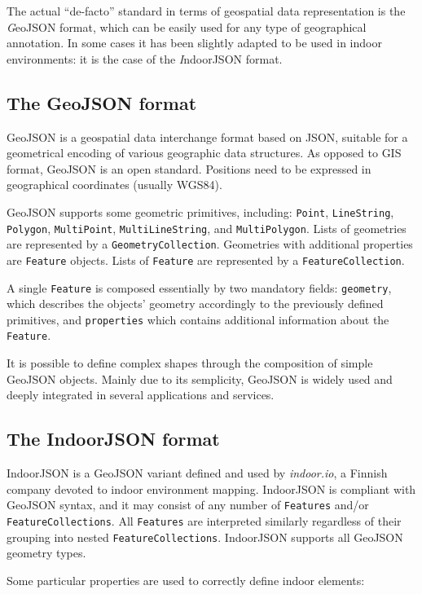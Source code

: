 The actual ``de-facto'' standard in terms of geospatial data representation is
the {\emph GeoJSON} format, which can be easily used for any type of geographical
annotation. In some cases it has been slightly adapted to be used in indoor
environments: it is the case of the {\emph IndoorJSON} format.

\subsection{The GeoJSON format}\label{the-geojson-format}

GeoJSON is a geospatial data interchange format based on JSON, suitable for a
geometrical encoding of various geographic data structures. As opposed to GIS
format, GeoJSON is an open standard. Positions need to be expressed in
geographical coordinates (usually WGS84).

GeoJSON supports some geometric primitives, including: {\tt Point},
{\tt Line\-String}, {\tt Polygon}, {\tt MultiPoint},
{\tt MultiLineString}, and {\tt MultiPolygon}. Lists of geometries are
represented by a {\tt GeometryCollection}. Geometries with additional
properties are {\tt Feature} objects. Lists of {\tt Feature} are
represented by a {\tt FeatureCollection}.

A single {\tt Feature} is composed essentially by two mandatory fields:
{\tt geometry}, which describes the objects' geometry accordingly to the
previously defined primitives, and {\tt properties} which contains
additional information about the {\tt Feature}.

It is possible to define complex shapes through the composition of simple
GeoJSON objects. Mainly due to its semplicity, GeoJSON is widely used and
deeply integrated in several applications and services.

\subsection{The IndoorJSON format}\label{experiences-on-indoor-json}

IndoorJSON is a GeoJSON variant defined and used by \emph{indoor.io}, a
Finnish company devoted to indoor environment mapping. IndoorJSON is compliant
with GeoJSON syntax, and it may consist of any number of {\tt Features}
and/or {\tt FeatureCollections}. All {\tt Features} are interpreted
similarly regardless of their grouping into nested
{\tt FeatureCollections}. IndoorJSON supports all GeoJSON geometry types.

Some particular properties are used to correctly define indoor elements:

